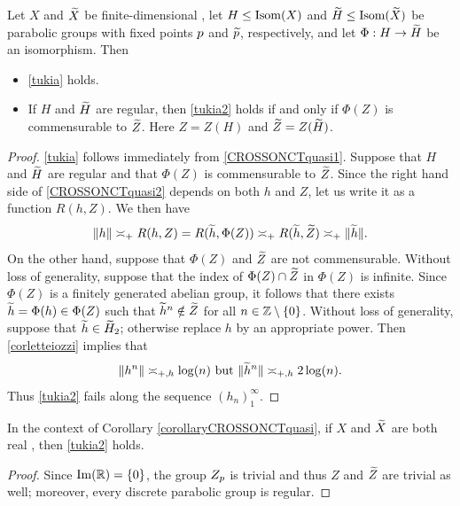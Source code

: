 {\begin{corollary}
\label{corollaryCROSSONCTquasi}
Let $X$ and $\widetilde X$ be finite-dimensional \CROSSs, let $H\leq\operatorname{Isom}(X)$ and $\widetilde H\leq \operatorname{Isom}(\widetilde X)$ be parabolic groups with fixed points $p$ and $\widetilde{p}$, respectively, and let $\Phi:H\to\widetilde H$ be an isomorphism. Then
\begin{itemize}
\item[(i)] \eqref{tukia} holds.
\item[(ii)] If $H$ and $\widetilde H$ are regular, then \eqref{tukia2} holds if and only if $\Phi(Z)$ is commensurable to $\widetilde Z$. Here $Z = Z(H)$ and $\widetilde Z = Z(\widetilde H)$.
\end{itemize}
\end{corollary}
\begin{proof}
\eqref{tukia} follows immediately from \eqref{CROSSONCTquasi1}. %
Suppose that $H$ and $\widetilde H$ are regular and that $\Phi(Z)$ is commensurable to $\widetilde Z$. Since the right hand side of \eqref{CROSSONCTquasi2} depends on both $h$ and $Z$, let us write it as a function $R(h,Z)$. We then have
\[
\|h\| \asymp_+ R(h,Z) = R(\widetilde h, \Phi(Z)) \asymp_+ R(\widetilde h,\widetilde Z) \asymp_+ \|\widetilde h\|.
\]
On the other hand, suppose that $\Phi(Z)$ and $\widetilde Z$ are not commensurable. Without loss of generality, suppose that the index of $\Phi(Z)\cap \widetilde Z$ in $\Phi(Z)$ is infinite. Since $\Phi(Z)$ is a finitely generated abelian group, it follows that there exists $\widetilde h = \Phi(h)\in \Phi(Z)$ such that $\widetilde h^n\notin \widetilde Z$ for all $n\in\Z\butnot\{0\}$. Without loss of generality, suppose that $\widetilde h\in \widetilde H_2$; otherwise replace $h$ by an appropriate power. Then \eqref{corletteiozzi} implies that
\[
\|h^n\| \asymp_{+,h} \log(n) \textup{ but } \|\widetilde h^n\| \asymp_{+,h} 2\log(n).
\]
Thus \eqref{tukia2} fails along the sequence $(h_n)_1^\infty$.
\end{proof}


\begin{corollary}
\label{corollaryrealROSSONCTquasi}
In the context of Corollary \ref{corollaryCROSSONCTquasi}, if $X$ and $\widetilde X$ are both real \ROSSs, then \eqref{tukia2} holds.
\end{corollary}
\begin{proof}
Since $\Im(\R) = \{0\}$, the group $Z_p$ is trivial and thus $Z$ and $\widetilde Z$ are trivial as well; moreover, every discrete parabolic group is regular.
\end{proof}


}
